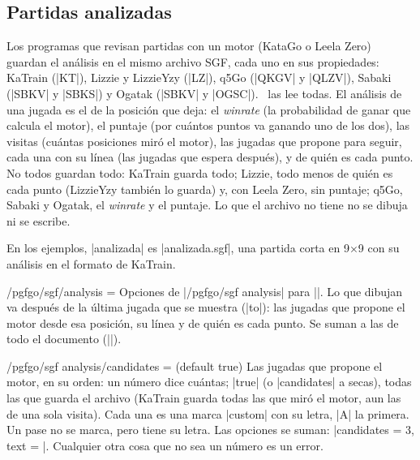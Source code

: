 \subsection{Partidas analizadas}
\label{subsec:sgfanalisis}

Los programas que revisan partidas con un motor (KataGo o Leela Zero) guardan el análisis en el mismo archivo SGF, cada uno en sus propiedades: KaTrain (|KT|), Lizzie y LizzieYzy (|LZ|), q5Go (|QKGV| y |QLZV|), Sabaki (|SBKV| y |SBKS|) y Ogatak (|SBKV| y |OGSC|). \pgfgoname\ las lee todas. El análisis de una jugada es el de la posición que deja: el \emph{winrate} (la probabilidad de ganar que calcula el motor), el puntaje (por cuántos puntos va ganando uno de los dos), las visitas (cuántas posiciones miró el motor), las jugadas que propone para seguir, cada una con su línea (las jugadas que espera después), y de quién es cada punto. No todos guardan todo: KaTrain guarda todo; Lizzie, todo menos de quién es cada punto (LizzieYzy también lo guarda) y, con Leela Zero, sin puntaje; q5Go, Sabaki y Ogatak, el \emph{winrate} y el puntaje. Lo que el archivo no tiene no se dibuja ni se escribe.

En los ejemplos, |analizada| es |analizada.sgf|, una partida corta en 9×9 con su análisis en el formato de KaTrain.

\begin{key}{/pgfgo/sgf/analysis = }
	Opciones de |/pgfgo/sgf analysis| para |\sgf|. Lo que dibujan va después de la última jugada que se muestra (|to|): las jugadas que propone el motor desde esa posición, su línea y de quién es cada punto. Se suman a las de todo el documento (||).

	\begin{codeexample}[]
		\begin{goban}[9, scale = 0.6]
		\end{goban}
		\pgfgocandidates
	\end{codeexample}
\end{key}

\begin{key}{/pgfgo/sgf analysis/candidates =  (default true)}
	Las jugadas que propone el motor, en su orden: un número dice cuántas; |true| (o |candidates| a secas), todas las que guarda el archivo (KaTrain guarda todas las que miró el motor, aun las de una sola visita). Cada una es una marca |custom| con su letra, |A| la primera. Un pase no se marca, pero tiene su letra. Las opciones se suman: |candidates = {3, text = \pgfgowinrate}|. Cualquier otra cosa que no sea un número es un error.
\end{key}

